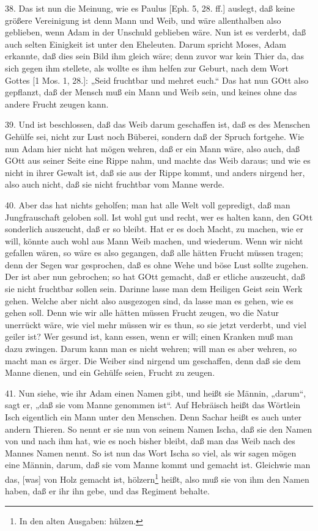 38. Das ist nun die Meinung, wie es Paulus [Eph. 5, 28. ff.] auslegt, daß keine größere Vereinigung ist denn Mann und Weib, und wäre allenthalben also geblieben, wenn Adam in der Unschuld geblieben wäre. Nun ist es verderbt, daß auch selten Einigkeit ist unter den Eheleuten. Darum spricht Moses, Adam erkannte, daß dies sein Bild ihm gleich wäre; denn zuvor war kein Thier da, das sich gegen ihm stellete, als wollte es ihm helfen zur Geburt, nach dem Wort Gottes [1 Mos. 1, 28.]: „Seid fruchtbar und mehret euch.“ Das hat nun GOtt also gepflanzt, daß der Mensch muß ein Mann und Weib sein, und keines ohne das andere Frucht zeugen kann.

39. Und ist beschlossen, daß das Weib darum geschaffen ist, daß es des Menschen Gehülfe sei, nicht zur Lust noch Büberei, sondern daß der Spruch fortgehe. Wie nun Adam hier nicht hat mögen wehren, daß er ein Mann wäre, also auch, daß GOtt aus seiner Seite eine Rippe nahm, und machte das Weib daraus; und wie es nicht in ihrer Gewalt ist, daß sie aus der Rippe kommt, und anders nirgend her, also auch nicht, daß sie nicht fruchtbar vom Manne werde.

40. Aber das hat nichts geholfen; man hat alle Welt voll gepredigt, daß man Jungfrauschaft geloben soll. Ist wohl gut und recht, wer es halten kann, den GOtt sonderlich auszeucht, daß er so bleibt. Hat er es doch Macht, zu machen, wie er will, könnte auch wohl aus Mann Weib machen, und wiederum. Wenn wir nicht gefallen wären, so wäre es also gegangen, daß alle hätten Frucht müssen tragen; denn der Segen war gesprochen, daß es ohne Wehe und böse Lust sollte zugehen. Der ist aber nun gebrochen; so hat GOtt gemacht, daß er etliche auszeucht, daß sie nicht fruchtbar sollen sein. Darinne lasse man dem Heiligen Geist sein Werk gehen. Welche aber nicht also ausgezogen sind, da lasse man es gehen, wie es gehen soll. Denn wie wir alle hätten müssen Frucht zeugen, wo die Natur unerrückt wäre, wie viel mehr müssen wir es thun, so sie jetzt verderbt, und viel geiler ist? Wer gesund ist, kann essen, wenn er will; einen Kranken muß man dazu zwingen. Darum kann man es nicht wehren; will man es aber wehren, so macht man es ärger. Die Weiber sind nirgend um geschaffen, denn daß sie dem Manne dienen, und ein Gehülfe seien, Frucht zu zeugen.

41. Nun siehe, wie ihr Adam einen Namen gibt, und heißt sie Männin, „darum“, sagt er, „daß sie vom Manne genommen ist“. Auf Hebräisch heißt das Wörtlein Isch eigentlich ein Mann unter den Menschen. Denn Sachar heißt es auch unter andern Thieren. So nennt er sie nun von seinem Namen Ischa, daß sie den Namen von und nach ihm hat, wie es noch
bisher bleibt, daß man das Weib nach des Mannes Namen nennt. So ist nun das Wort Ischa so viel, als wir sagen mögen eine Männin, darum, daß sie vom Manne kommt und gemacht ist. Gleichwie man das, [was] von Holz gemacht ist, hölzern\footnote{In den alten Ausgaben: hülzen.} heißt, also muß sie von ihm den Namen haben, daß er ihr ihn gebe, und das Regiment behalte.

